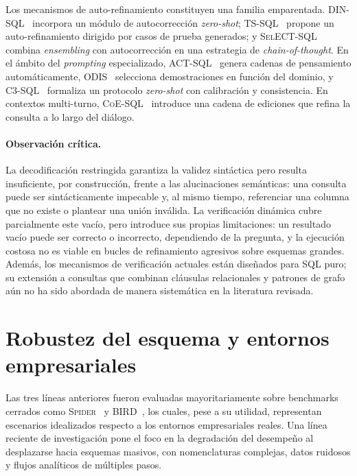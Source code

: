 Los mecanismos de auto-refinamiento constituyen una familia emparentada.
\textsc{DIN-SQL}~\cite{DIN-SQL2023} incorpora un módulo de autocorrección
\emph{zero-shot}; \textsc{TS-SQL}~\cite{TS-SQL2025} propone un
auto-refinamiento dirigido por casos de prueba generados; y
\textsc{SelECT-SQL}~\cite{SC-Prompt2023} combina \emph{ensembling} con
autocorrección en una estrategia de \emph{chain-of-thought}. En el ámbito
del \emph{prompting} especializado, \textsc{ACT-SQL}~\cite{ACT-SQL2023}
genera cadenas de pensamiento automáticamente, \textsc{ODIS}~%
\cite{ODIS2023} selecciona demostraciones en función del dominio, y
\textsc{C3-SQL}~\cite{C3-SQL2023} formaliza un protocolo \emph{zero-shot}
con calibración y consistencia. En contextos multi-turno,
\textsc{CoE-SQL}~\cite{CoE-SQL2024} introduce una cadena de ediciones que
refina la consulta a lo largo del diálogo.

\paragraph{Observación crítica.} La decodificación restringida garantiza la
validez sintáctica pero resulta insuficiente, por construcción, frente a
las alucinaciones semánticas: una consulta puede ser sintácticamente
impecable y, al mismo tiempo, referenciar una columna que no existe o
plantear una unión inválida. La verificación dinámica cubre parcialmente
este vacío, pero introduce sus propias limitaciones: un resultado vacío
puede ser correcto o incorrecto, dependiendo de la pregunta, y la ejecución
costosa no es viable en bucles de refinamiento agresivos sobre esquemas
grandes. Además, los mecanismos de verificación actuales están diseñados
para \ac{SQL} puro; su extensión a consultas que combinan cláusulas
relacionales y patrones de grafo aún no ha sido abordada de manera
sistemática en la literatura revisada.

\section{Robustez del esquema y entornos empresariales}
\label{sec:sota-robustez}

Las tres líneas anteriores fueron evaluadas mayoritariamente sobre
benchmarks cerrados como \textsc{Spider}~\cite{Spider2018} y
\textsc{BIRD}~\cite{BIRD2023}, los cuales, pese a su utilidad, representan escenarios
idealizados respecto a los entornos empresariales reales. Una línea reciente
de investigación pone el foco en la degradación del desempeño al desplazarse
hacia esquemas masivos, con nomenclaturas complejas, datos ruidosos y flujos
analíticos de múltiples pasos.

